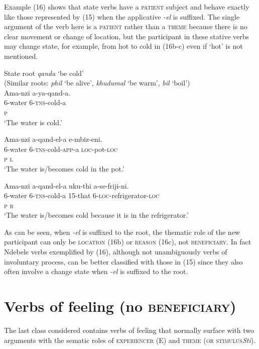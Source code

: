 \documentclass[output=paper]{langsci/langscibook}
\begin{document}
Example (16) shows that state verbs have a \textsc{patient} subject and behave exactly like those represented by (15) when the applicative \textit{-el} is suffixed. The single argument of the verb here is a \textsc{patient} rather than a \textsc{theme} because there is no clear movement or change of location, but the participant in these stative verbs may change state, for example, from hot to cold in (16b-c) even if ‘hot’ is not mentioned. 

\ea
{State root \textit{qanda} ‘be cold’}\\
 (Similar roots: \textit{phil} ‘be alive’, \textit{khudumal} ‘be warm’, \textit{bil} ‘boil’)\\
\ea
\gll Ama-nzi a-ya-qand-a. \\
 6-water 6-\textsc{tns}-cold-a\\
 \textsc{p }\\
\glt ‘The water is cold.’

\ex
\gll Ama-nzi a-qand-el-a e-mbiz-eni. \\
 6-water 6-\textsc{tns}-cold-\textsc{app}-a \textsc{loc}-pot-\textsc{loc}\\
 \textsc{p l}\\
\glt ‘The water is/becomes cold in the pot.’

\ex
\gll Ama-nzi a-qand-el-a uku-thi a-se-friji-ni. \\
 6-water 6-\textsc{tns}-cold-a \textsc{15}-that 6-\textsc{loc}-refrigerator-\textsc{loc} \\
 \textsc{p r }\\
\glt ‘The water is/becomes cold because it is in the refrigerator.’
\z
\z

As can be seen, when \textit{-el} is suffixed to the root, the thematic role of the new participant can only be \textsc{location }(16b) or \textsc{reason }(16c), not \textsc{beneficiary}. In fact Ndebele verbs exemplified by (16), although not unambiguously verbs of involuntary process, can be better classified with those in (15) since they also often involve a change state when \textit{-el} is suffixed to the root.

\section{Verbs of feeling (no \textsc{beneficiary)}}

The last class considered contains verbs of feeling that normally surface with two arguments with the sematic roles of \textsc{experiencer} (E) and \textsc{theme }(\textsc{or stimulus}\textit {Sti}). 
\end{document}
